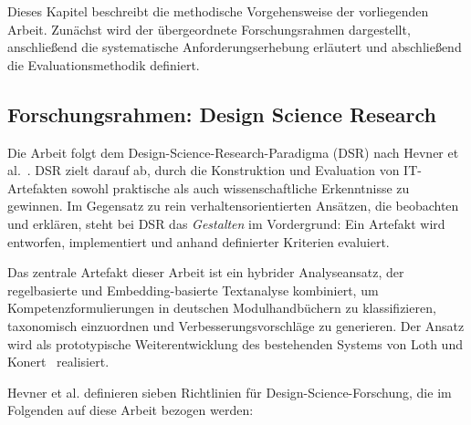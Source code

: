 
Dieses Kapitel beschreibt die methodische Vorgehensweise der vorliegenden Arbeit.
Zunächst wird der übergeordnete Forschungsrahmen dargestellt, anschließend die systematische Anforderungserhebung erläutert und abschließend die Evaluationsmethodik definiert.

\subsection{Forschungsrahmen: Design Science Research}\label{sec:dsr}

Die Arbeit folgt dem Design-Science-Research-Paradigma (DSR) nach Hevner et al.~\cite{hevner2004designscience}.
DSR zielt darauf ab, durch die Konstruktion und Evaluation von IT-Artefakten sowohl praktische als auch wissenschaftliche Erkenntnisse zu gewinnen.
Im Gegensatz zu rein verhaltensorientierten Ansätzen, die beobachten und erklären, steht bei DSR das \emph{Gestalten} im Vordergrund: Ein Artefakt wird entworfen, implementiert und anhand definierter Kriterien evaluiert.

Das zentrale Artefakt dieser Arbeit ist ein hybrider Analyseansatz, der regelbasierte und Embedding-basierte Textanalyse kombiniert, um Kompetenzformulierungen in deutschen Modulhandbüchern zu klassifizieren, taxonomisch einzuordnen und Verbesserungsvorschläge zu generieren.
Der Ansatz wird als prototypische Weiterentwicklung des bestehenden Systems von Loth und Konert~\cite{loth2022kompetenzeditor} realisiert.

Hevner et al. definieren sieben Richtlinien für Design-Science-Forschung, die im Folgenden auf diese Arbeit bezogen werden:

